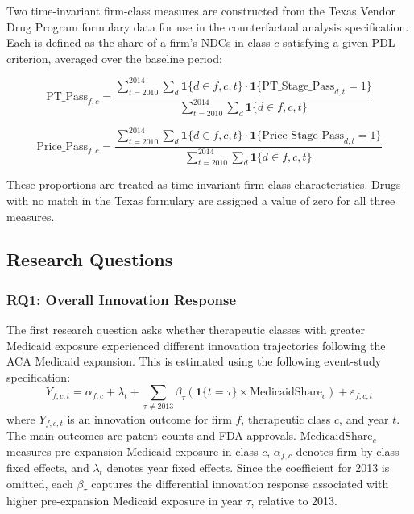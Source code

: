 \documentclass[12pt]{article}
\begin{document}
Two time-invariant firm-class measures are constructed from the Texas Vendor Drug Program formulary data for use in the counterfactual analysis specification. Each is defined as the share of a firm's NDCs in class $c$ satisfying a given PDL criterion, averaged over the baseline period:

\begin{equation}
\text{PT\_Pass}_{f,c} = \frac{\sum_{t=2010}^{2014} \sum_{d} \mathbf{1}\{d \in f, c, t\} \cdot \mathbf{1}\{\text{PT\_Stage\_Pass}_{d,t} = 1\}}{\sum_{t=2010}^{2014} \sum_{d} \mathbf{1}\{d \in f, c, t\}}
\end{equation}

\begin{equation}
\text{Price\_Pass}_{f,c} = \frac{\sum_{t=2010}^{2014} \sum_{d} \mathbf{1}\{d \in f, c, t\} \cdot \mathbf{1}\{\text{Price\_Stage\_Pass}_{d,t} = 1\}}{\sum_{t=2010}^{2014} \sum_{d} \mathbf{1}\{d \in f, c, t\}}
\end{equation}

These proportions are treated as time-invariant firm-class characteristics. Drugs with no match in the Texas formulary are assigned a value of zero for all three measures.

\subsection{Research Questions}

\subsubsection{RQ1: Overall Innovation Response}

The first research question asks whether therapeutic classes with greater Medicaid exposure experienced different innovation trajectories following the ACA Medicaid expansion. This is estimated using the following event-study specification:
\begin{equation}
Y_{f,c,t} = \alpha_{f,c} + \lambda_t + \sum_{\tau \neq 2013} \beta_{\tau}\left(\mathbf{1}\{t=\tau\} \times \text{MedicaidShare}_c\right) + \varepsilon_{f,c,t}
\end{equation}
where $Y_{f,c,t}$ is an innovation outcome for firm $f$, therapeutic class $c$, and year $t$. The main outcomes are patent counts and FDA approvals. $\text{MedicaidShare}_c$ measures pre-expansion Medicaid exposure in class $c$, $\alpha_{f,c}$ denotes firm-by-class fixed effects, and $\lambda_t$ denotes year fixed effects. Since the coefficient for 2013 is omitted, each $\beta_{\tau}$ captures the differential innovation response associated with higher pre-expansion Medicaid exposure in year $\tau$, relative to 2013.
\end{document}
